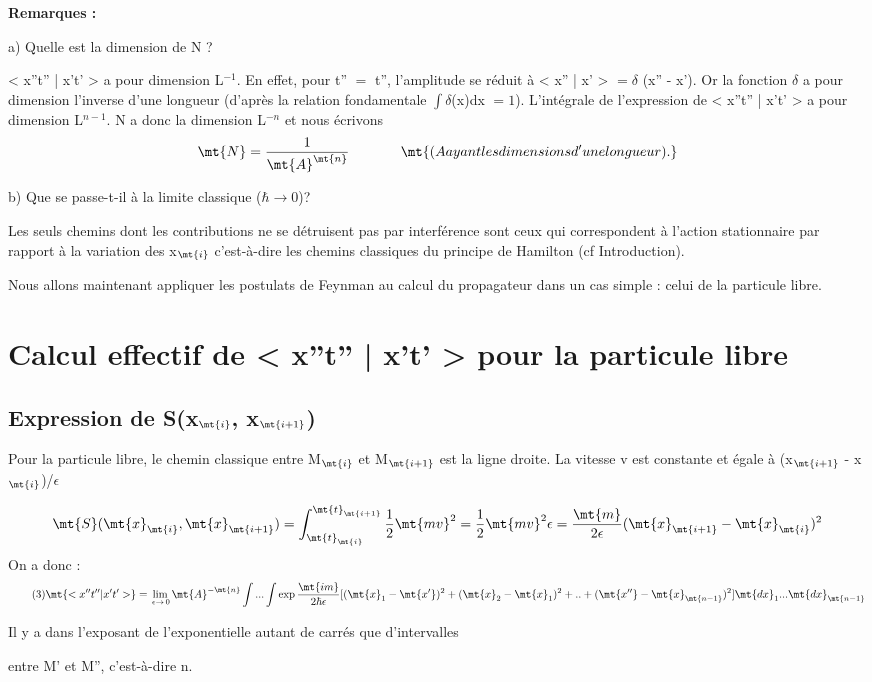 {\bf Remarques :}

a) Quelle est la dimension de N ?

< x''t'' | x't' > a pour dimension L$^{-1}$. En effet, pour t'' $=$ t'',
l'amplitude se réduit à < x'' | x' > $= \delta$  (x'' - x'). Or la fonction
$\delta$ a pour dimension l'inverse d'une longueur (d'après la relation
fondamentale $\int \delta$(x)dx $=1$). L'intégrale de l'expression de < x''t'' | x't' > 
a pour dimension L$^{n-1}$. N a donc la dimension L$^{-n}$ et nous écrivons
\[
\mt{N}=\frac{1}{\mt{A}^\mt{n}}
\ \ \ \ \ \ \ \ \ \ \ \mt{(A ayant les dimensions d'une longueur).}
\]
 
b) Que se passe-t-il à la limite classique ($\hbar \to 0$)?

Les seuls chemins dont les contributions ne se détruisent pas par
interférence sont ceux qui correspondent à l'action stationnaire
par rapport à la variation des x$_\mt{i}$ c'est-à-dire les chemins classiques
du principe de Hamilton (cf Introduction).

Nous allons maintenant appliquer les postulats de Feynman au
calcul du propagateur dans un cas simple : celui de la particule libre.

\section{Calcul effectif de < x''t'' | x't' > pour la particule libre}

\subsection{Expression de S(x$_\mt{i}$, x$_\mt{i+1}$)}

Pour la particule libre, le chemin classique entre M$_\mt{i}$ et M$_\mt{i+1}$
est la ligne droite. La vitesse v est constante et égale à
(x$_\mt{i+1}$ - x$_\mt{i}$)/$\epsilon$

\[
\mt{S}(\mt{x}_\mt{i}, \mt{x}_\mt{i+1}) = \int_{\mt{t}_\mt{i}}^{\mt{t}_\mt{i+1}}
\frac{1}{2}\mt{mv}^2 = \frac{1}{2}\mt{mv}^2 \epsilon
 = \frac{\mt{m}}{2\epsilon}(\mt{x}_\mt{i+1}-\mt{x}_\mt{i})^2
\]
On a donc :
\[
\tag{3} \mt{< x''t'' | x't' > } = \lim_{\,\epsilon \to \,0} \mt{A}^{-\mt{n}}
\int...\int
\exp\frac{\mt{im}}{2\hbar\epsilon}
[(\mt{x}_1-\mt{x'})^2 + (\mt{x}_2-\mt{x}_1)^2 +..+ (\mt{x'' }-\mt{x}_\mt{n-1})^2]
\mt{dx}_1...\mt{dx}_\mt{n-1} 
\]

Il y a dans l'exposant de l'exponentielle autant de carrés que d'intervalles

entre M' et M'', c'est-à-dire n.

